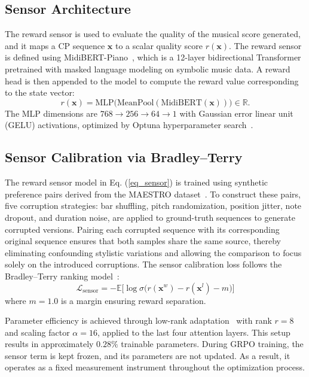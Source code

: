 \documentclass[letterpaper, 10 pt, conference]{ieeeconf}
\begin{document}
\subsection{Sensor Architecture}

The reward sensor is used to evaluate the quality of the musical score generated, and it maps a CP sequence $\textbf{x}$ to a scalar quality score $r(\textbf{x})$. The reward sensor is defined using MidiBERT-Piano~\cite{midibertpiano}, which is a 12-layer bidirectional Transformer pretrained with masked language modeling on symbolic music data. A reward head is then appended to the model to compute the reward value corresponding to the state vector:
\begin{equation}
\label{eq_sensor}
    r(\textbf{x}) = \mathrm{MLP}\bigl(\mathrm{MeanPool}(\mathrm{MidiBERT}(\textbf{x}))\bigr) \in \mathbb{R}.
\end{equation}
The MLP dimensions are $768 \to 256 \to 64 \to 1$ with Gaussian error linear unit (GELU) activations, optimized by Optuna hyperparameter search~\cite{optuna}.

\subsection{Sensor Calibration via Bradley--Terry}

The reward sensor model in Eq. (\ref{eq_sensor}) is trained using synthetic preference pairs derived from the MAESTRO dataset~\cite{maestro}. To construct these pairs, five corruption strategies: bar shuffling, pitch randomization, position jitter, note dropout, and duration noise, are applied to ground-truth sequences to generate corrupted versions. Pairing each corrupted sequence with its corresponding original sequence ensures that both samples share the same source, thereby eliminating confounding stylistic variations and allowing the comparison to focus solely on the introduced corruptions. The sensor calibration loss follows the Bradley--Terry ranking model~\cite{bradley1952rank}:
\begin{equation}
    \mathcal{L}_{\mathrm{sensor}} = -\mathbb{E}\bigl[\log \sigma\bigl(r(\textbf{x}^w) - r(\textbf{x}^l) - m\bigr)\bigr]
\end{equation}
where $m = 1.0$ is a margin ensuring reward separation.

Parameter efficiency is achieved through low-rank adaptation~\cite{hu2022lora} with rank $r = 8$ and scaling factor $\alpha = 16$, applied to the last four attention layers. This setup results in approximately $0.28\%$ trainable parameters.
During GRPO training, the sensor term is kept frozen, and its parameters are not updated. As a result, it operates as a fixed measurement instrument throughout the optimization process.
\end{document}
